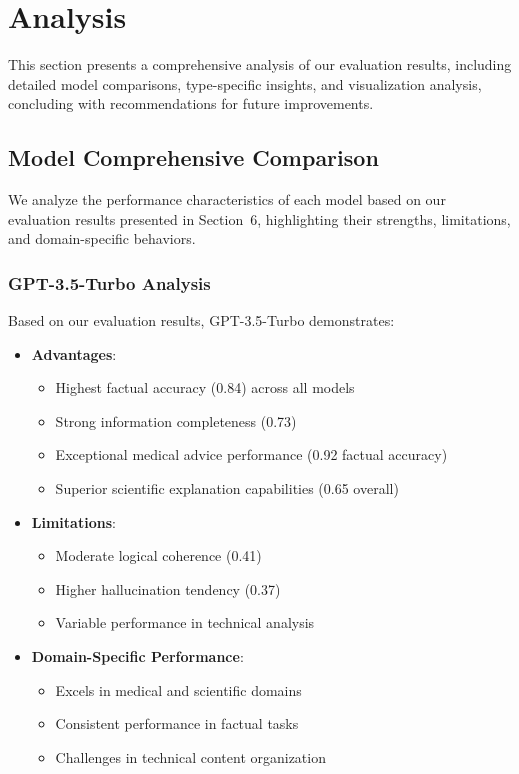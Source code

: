 \section{Analysis}
This section presents a comprehensive analysis of our evaluation results, including detailed model comparisons, type-specific insights, and visualization analysis, concluding with recommendations for future improvements.

\subsection{Model Comprehensive Comparison}
We analyze the performance characteristics of each model based on our evaluation results presented in Section~6, highlighting their strengths, limitations, and domain-specific behaviors.

\vspace{0.5em}
\subsubsection{GPT-3.5-Turbo Analysis}
Based on our evaluation results, GPT-3.5-Turbo demonstrates:
\begin{itemize}
    \item \textbf{Advantages}:
    \begin{itemize}
        \item Highest factual accuracy (0.84) across all models
        \item Strong information completeness (0.73)
        \item Exceptional medical advice performance (0.92 factual accuracy)
        \item Superior scientific explanation capabilities (0.65 overall)
    \end{itemize}
    \vspace{0.5em}
    \item \textbf{Limitations}:
    \begin{itemize}
        \item Moderate logical coherence (0.41)
        \item Higher hallucination tendency (0.37)
        \item Variable performance in technical analysis
    \end{itemize}
    \vspace{0.5em}
    \item \textbf{Domain-Specific Performance}:
    \begin{itemize}
        \item Excels in medical and scientific domains
        \item Consistent performance in factual tasks
        \item Challenges in technical content organization
    \end{itemize}
\end{itemize}

